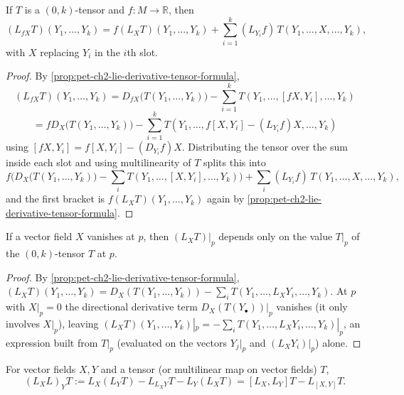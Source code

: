 \begin{proposition}
  \label{prop:pet-ch2-lie-derivative-scaling}
  \leanok
  If $T$ is a $(0,k)$-tensor and $f:M\to\mathbb{R}$, then
  \[
    (L_{fX}T)(Y_1,\dots,Y_k)
    = f(L_XT)(Y_1,\dots,Y_k)+\sum_{i=1}^k(L_{Y_i}f)\,T(Y_1,\dots,X,\dots,Y_k),
  \]
  with $X$ replacing $Y_i$ in the $i$th slot.
\end{proposition}
\begin{proof}
  \leanok
  By \cref{prop:pet-ch2-lie-derivative-tensor-formula},
  \[
    (L_{fX}T)(Y_1,\dots,Y_k)
    = D_{fX}\big(T(Y_1,\dots,Y_k)\big)-\sum_{i=1}^kT(Y_1,\dots,[fX,Y_i],\dots,Y_k)
  \]
  \[
    = fD_X\big(T(Y_1,\dots,Y_k)\big)-\sum_{i=1}^kT(Y_1,\dots,f[X,Y_i]-(L_{Y_i}f)X,\dots,Y_k)
  \]
  using $[fX,Y_i]=f[X,Y_i]-(D_{Y_i}f)X$. Distributing the tensor over the
  sum inside each slot and using multilinearity of $T$ splits this into
  \[
    f\Big(D_X\big(T(Y_1,\dots,Y_k)\big)-\sum_iT(Y_1,\dots,[X,Y_i],\dots,Y_k)\Big)
    +\sum_i(L_{Y_i}f)\,T(Y_1,\dots,X,\dots,Y_k),
  \]
  and the first bracket is $f(L_XT)(Y_1,\dots,Y_k)$ again by
  \cref{prop:pet-ch2-lie-derivative-tensor-formula}.
\end{proof}

\begin{lemma}
  \label{lem:pet-ch2-lie-derivative-local-vanishing}
  \leanok
  If a vector field $X$ vanishes at $p$, then $(L_XT)|_p$ depends only on the
  value $T|_p$ of the $(0,k)$-tensor $T$ at $p$.
\end{lemma}
\begin{proof}
  \leanok
  By \cref{prop:pet-ch2-lie-derivative-tensor-formula},
  $(L_XT)(Y_1,\dots,Y_k)=D_X(T(Y_1,\dots,Y_k))-\sum_iT(Y_1,\dots,L_XY_i,\dots,Y_k)$.
  At $p$ with $X|_p=0$ the directional derivative term $D_X(T(Y_\bullet))|_p$
  vanishes (it only involves $X|_p$), leaving
  $(L_XT)(Y_1,\dots,Y_k)|_p=-\sum_iT(Y_1,\dots,L_XY_i,\dots,Y_k)|_p$, an
  expression built from $T|_p$ (evaluated on the vectors $Y_j|_p$ and
  $(L_XY_i)|_p$) alone.
\end{proof}

\begin{definition}
  \label{def:pet-ch2-generalized-lie-derivative}
  \leanok
  For vector fields $X,Y$ and a tensor (or multilinear map on vector fields)
  $T$,
  \[
    (L_XL)_YT := L_X(L_YT)-L_{L_XY}T-L_Y(L_XT) = [L_X,L_Y]T-L_{[X,Y]}T.
  \]
\end{definition}

